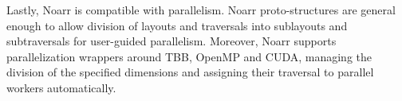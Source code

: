 Lastly, Noarr is compatible with parallelism. Noarr proto-structures are general enough to allow division of layouts and traversals into sublayouts and subtraversals for user-guided parallelism. Moreover, Noarr supports parallelization wrappers around TBB, OpenMP and CUDA, managing the division of the specified dimensions and assigning their traversal to parallel workers automatically.








